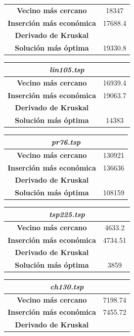 \documentclass[12pt,spanish]{article}
\begin{document}
\begin{figure}[H]
\begin{tabular}{|c|c|}
\hline
\textbf{Vecino más cercano} & 18347\\
\textbf{Inserción más económica} & 17688.4 \\
\textbf{Derivado de Kruskal} & \\
\textbf{Solución más óptima} & 19330.8\\
\hline	
\end{tabular}
\vspace{0.5cm}
\quad
\begin{tabular}{|c|c|}
\hline	
\multicolumn{2}{|c|}{\textit{lin105.tsp}}\\
\hline
\textbf{Vecino más cercano} & 16939.4\\
\textbf{Inserción más económica} & 19063.7\\
\textbf{Derivado de Kruskal} & \\
\textbf{Solución más óptima} & 14383\\
\hline	
\end{tabular}
\vspace{0.5cm}
\quad
\begin{tabular}{|c|c|}
\hline	
\multicolumn{2}{|c|}{\textit{pr76.tsp}}\\
\hline
\textbf{Vecino más cercano} & 130921\\
\textbf{Inserción más económica} & 136636\\
\textbf{Derivado de Kruskal} & \\
\textbf{Solución más óptima} & 108159\\
\hline	
\end{tabular}
\vspace{0.5cm}
\quad
\begin{tabular}{|c|c|}
\hline	
\multicolumn{2}{|c|}{\textit{tsp225.tsp}}\\
\hline
\textbf{Vecino más cercano} & 4633.2\\
\textbf{Inserción más económica} & 4734.51\\
\textbf{Derivado de Kruskal} & \\
\textbf{Solución más óptima} & 3859 \\
\hline	
\end{tabular}
\vspace{0.5cm}
\quad
\begin{tabular}{|c|c|}
\hline	
\multicolumn{2}{|c|}{\textit{ch130.tsp}}\\
\hline
\textbf{Vecino más cercano} & 7198.74\\
\textbf{Inserción más económica} & 7455.72\\
\textbf{Derivado de Kruskal} & \\

\end{tabular}
\end{figure}
\end{document}
